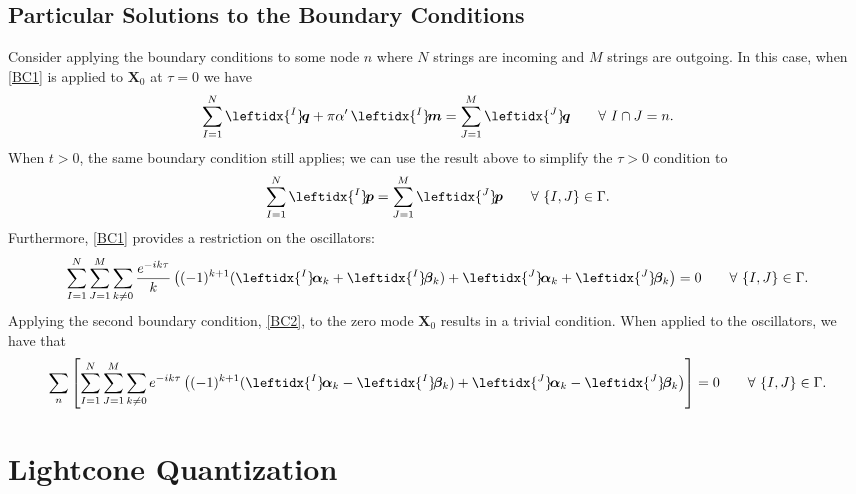 \documentclass{revtex4}
\newcommand{\be}{\begin{eqnarray}}
\newcommand{\ee}{\end{eqnarray}}
\def\X{\bm{X}}
\def\p{\bm{p}}
\def\q{\bm{q}}
\def\a{\bm{a}}
\def\m{\bm{m}}
\def\b{\bm{b}}
\def\lI{\leftidx{^I} \! }
\def\lJ{\leftidx{^J} \! }
\def\a{\bm{\alpha}}
\def\b{\bm{\beta}}
\begin{document}

\subsection{Particular Solutions to the Boundary Conditions}

Consider applying the boundary conditions to some node $n$ where $N$ strings are incoming and $M$ strings are outgoing. In this case, when \eqref{BC1} is applied to $\X_0$ at $\tau = 0$ we have
\be
\sum^N_{I = 1} \lI \q + \pi \alpha' \, \lI \m = \sum^M_{J = 1}  \lJ \q \qquad \forall \ I \cap J = n .
\ee
When $t > 0$, the same boundary condition still applies; we can use the result above to simplify the $\tau > 0$ condition to
\be
\sum^N_{I = 1} \lI \p = \sum^M_{J=1} \lJ \p \qquad \forall \ \{I,J\} \in \Gamma .
\ee
Furthermore, \eqref{BC1} provides a restriction on the oscillators:
\be
\sum^N_{I=1} \sum^M_{J=1} \sum_{k \neq 0} \frac{e^{-ik \tau}}{k} \left( (-1)^{k+1} ( \lI \a_k + \lI \b_k) + \lJ \a_k + \lJ \b_k \right) = 0 \qquad \forall \ \{I,J\} \in \Gamma .
\ee
Applying the second boundary condition, \eqref{BC2}, to the zero mode $\X_0$ results in a trivial condition. When applied to the oscillators, we have that
\be
\sum_n \left[ \sum_{I=1}^N \sum_{J=1}^M \sum_{k \neq 0} e^{-ik\tau} \left( (-1)^{k+1} (\lI \a_k - \lI \b_k) + \lJ \a_k - \lJ \b_k \right) \right] = 0 \qquad \forall \ \{I,J\} \in \Gamma.
\ee


\section{Lightcone Quantization}
\end{document}
